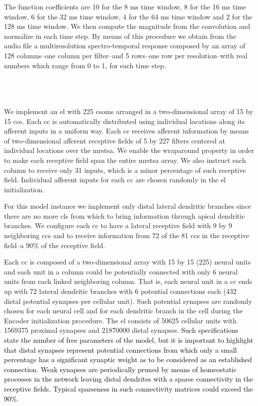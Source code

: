 \documentclass[10pt,letterpaper]{article}
\newcommand{\reviewerfour}[1]{\textcolor{black}{#1}}
\begin{document}
The function coefficients are 10 for the 8 ms time window, 8 for the 16 ms time window, 6 for the 32 ms time window, 4 for the 64 ms time window
and 2 for the 128 ms time window. We then compute the magnitude from the convolution and normalize in each time step.
By means of this procedure we obtain from the audio file a multiresolution spectro-temporal response composed by
an array of 128 columns--one column per filter--and 5 rows--one row per resolution--with real numbers which range from
0 to 1, for each time step.









~\\
~\\
~\\

We implement an \gls{el} with 225 \glspl{csom} arranged in a two-dimensional
array of 15 by 15 \glspl{cc}. Each \gls{cc} is automatically distributed using individual locations along its afferent inputs in a uniform way.
Each \gls{cc} receives afferent information by means of
two-dimensional afferent receptive fields of 5 by 227 filters centered at individual locations over the \gls{mrstsa}.
We enable the wraparound property in order to make each receptive field span the entire
\gls{mrstsa} array.
We also instruct each column to receive only 31 inputs, which is a minor percentage of such
receptive field.
Individual afferent inputs for each \gls{cc} are chosen randomly in the \gls{el} initialization. 

For this model instance we implement only distal lateral dendritic branches since there are
no more \glspl{cl} from which to bring information through apical dendritic branches.
We configure each \gls{cc} to have a lateral receptive field with 9 by 9 neighboring \glspl{cc}
and to receive information from 72 of the 81 \glspl{cc} in the receptive field--a 90\% of the receptive field.

Each \gls{cc} is composed of a two-dimensional array with 15 by 15 (225) neural units and
each unit in a column could be potentially connected with only 6 neural units from each linked neighboring column. 
That is, each neural unit in a \gls{cc} ends up with 72 lateral dendritic branches with 6 potential connections each
(432 distal potential synapses per cellular unit).
Such potential synapses are randomly chosen for each neural cell and for each dendritic branch in the cell during the Encoder initialization procedure.
The \gls{el} consists of 50625 cellular units with 1569375 proximal synapses and 21870000 distal synapses.
\reviewerfour{Such specifications state the number of free parameters of the model, but it is important to highlight that distal synapses represent
potential connections from which only a small percentage has a significant synaptic weight as to be considered as an established connection.
Weak synapses are periodically pruned by means of homeostatic processes in the network leaving distal dendrites with a sparse connectivity in the receptive fields.
Typical sparseness in such connectivity matrices could exceed the 90\%.}
\end{document}
